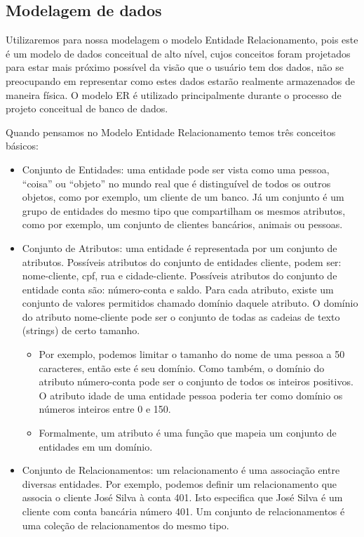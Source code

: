 \documentclass{article}
\begin{document}
\subsection{Modelagem de dados}
Utilizaremos para nossa modelagem o modelo Entidade Relacionamento, pois este é um modelo de dados conceitual de alto nível, cujos conceitos foram projetados para estar mais próximo possível da visão que o usuário tem dos dados, não se preocupando em representar como estes dados estarão realmente armazenados de maneira física. O modelo ER é utilizado principalmente durante o processo de projeto conceitual de banco de dados.

Quando pensamos no Modelo Entidade Relacionamento temos três conceitos básicos:
\begin{itemize}
    \item Conjunto de Entidades: uma entidade pode ser vista como uma pessoa, “coisa” ou “objeto” no mundo real que é distinguível de todos os outros objetos, como por exemplo, um cliente de um banco. Já um conjunto é um grupo de entidades do mesmo tipo que compartilham os mesmos atributos, como por exemplo, um conjunto de clientes bancários, animais ou pessoas.
    \item Conjunto de Atributos: uma entidade é representada por um conjunto de atributos. Possíveis atributos do conjunto de entidades cliente, podem ser: nome-cliente, cpf, rua e cidade-cliente. Possíveis atributos do conjunto de entidade conta são: número-conta e saldo. Para cada atributo, existe um conjunto de valores permitidos chamado domínio daquele atributo. O domínio do atributo nome-cliente pode ser o conjunto de todas as cadeias de texto (strings) de certo tamanho.
    \begin{itemize}
        \item Por exemplo, podemos limitar o tamanho do nome de uma pessoa a 50 caracteres, então este é seu domínio. Como também, o domínio do atributo número-conta pode ser o conjunto de todos os inteiros positivos. O atributo idade de uma entidade pessoa poderia ter como domínio os números inteiros entre 0 e 150.
        \item Formalmente, um atributo é uma função que mapeia um conjunto de entidades em um domínio.
    \end{itemize}
    \item Conjunto de Relacionamentos: um relacionamento é uma associação entre diversas entidades. Por exemplo, podemos definir um relacionamento que associa o cliente José Silva à conta 401. Isto especifica que José Silva é um cliente com conta bancária número 401. Um conjunto de relacionamentos é uma coleção de relacionamentos do mesmo tipo.
\end{itemize}
\end{document}
